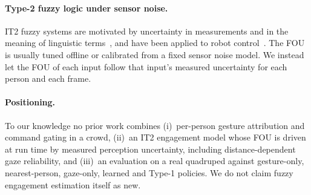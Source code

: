 \paragraph{Type-2 fuzzy logic under sensor noise.}
IT2 fuzzy systems are motivated by uncertainty in measurements and in the
meaning of linguistic terms~\cite{mendel2006it2simple}, and have been applied
to robot control~\cite{hagras2004hierarchical}. The FOU is usually tuned
offline or calibrated from a fixed sensor noise model. We instead let the FOU
of each input follow that input's measured uncertainty for each person and
each frame.

\paragraph{Positioning.}
To our knowledge no prior work combines (i)~per-person gesture attribution
and command gating in a crowd, (ii)~an IT2 engagement model whose FOU is
driven at run time by measured perception uncertainty, including
distance-dependent gaze reliability, and (iii)~an evaluation on a real
quadruped against gesture-only, nearest-person, gaze-only, learned and
Type-1 policies. We do not claim fuzzy engagement estimation itself as new.
